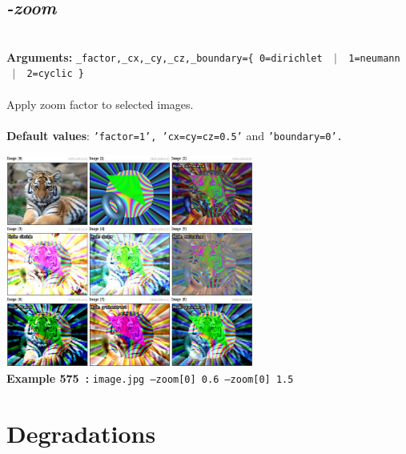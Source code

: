 \documentclass[a4paper,11pt,twoside]{book}
\begin{document}
\subsection{\emph{-zoom} }\vspace*{-0.5em}
~\\\textbf{Arguments: } 
{\small \texttt{\_factor,\_cx,\_cy,\_cz,\_boundary=\{ 0=dirichlet ~$|$~ 1=neumann ~$|$~ 2=cyclic \}}}\\~\\
Apply zoom factor to selected images.
~\\~\\\textbf{Default values}: {\small \texttt{'factor=1', 'cx=cy=cz=0.5'} and \texttt{'boundary=0'.}}
\begin{center}\includegraphics[keepaspectratio=true,height=7cm,width=\textwidth]{img/gmic_def575.jpg}\\
{\footnotesize \textbf{Example 575~:} \texttt{image.jpg --zoom[0] 0.6 --zoom[0] 1.5}}
\end{center}
\section{Degradations}
\end{document}
